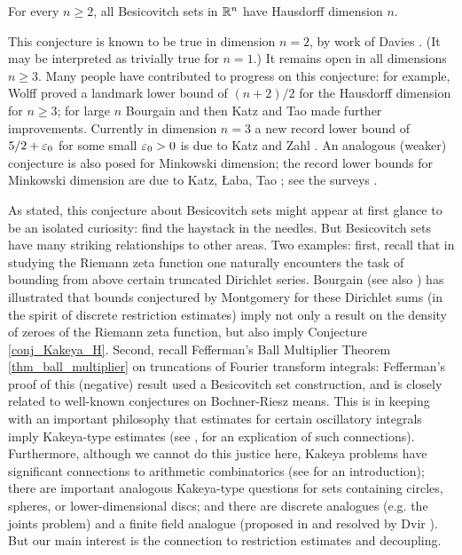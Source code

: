 \documentclass[brochure,english,12pt]{bourbaki}%
\begin{document}
\begin{conj}\label{conj_Kakeya_H}
For every $n \geq 2$, all Besicovitch sets in $\mathbb{R}^n$ have Hausdorff dimension $n$.
\end{conj}
This conjecture is known to be true in dimension $n=2$, by work of Davies \cite{Dav71}.  (It may be interpreted as trivially true for $n=1$.)
It remains open in all dimensions $n \geq 3$.
Many people have contributed to progress on this conjecture: for example, Wolff \cite{Wol95} proved a landmark lower bound of $(n+2)/2$ for the Hausdorff dimension for $n \geq 3$; for large $n$  Bourgain \cite{Bou99} and then Katz and Tao \cite{KatTao02b} made further improvements. Currently in dimension $n=3$ a new record lower bound of $5/2+\varepsilon_0$ for some small $\varepsilon_0>0$ is due to Katz and Zahl \cite{KatZah17x}.  An analogous (weaker) conjecture is also posed for Minkowski dimension; the record lower bounds for Minkowski dimension are due to Katz, \L aba, Tao \cite{KLT00,LabTao01,KatTao02b}; see the surveys \cite{KatTao02,Lab08}.


As stated, this conjecture about Besicovitch sets might appear at first glance to be an isolated curiosity: find the haystack in the needles. But Besicovitch sets have many striking relationships to other areas. Two examples: first, recall that in studying  the Riemann zeta function one naturally encounters the task of bounding from above certain truncated Dirichlet series. Bourgain \cite{Bou91a} (see also \cite{Wol99}) has illustrated that bounds conjectured by Montgomery  \cite[p. 72-73]{Mon71} for these Dirichlet sums  (in the spirit of discrete restriction estimates) imply not only a result on the density of zeroes of the Riemann zeta function, but also imply Conjecture \ref{conj_Kakeya_H}. 
Second, recall Fefferman's Ball Multiplier Theorem \ref{thm_ball_multiplier} on truncations of Fourier transform integrals: Fefferman's proof of this (negative) result used a Besicovitch set construction, and is closely related to well-known conjectures on Bochner-Riesz means.
This is in keeping  with an important philosophy that estimates for certain oscillatory integrals imply Kakeya-type estimates (see \cite{Fef73b},\cite{Car15x} for an explication of such connections). 
Furthermore, although we cannot do this justice here, Kakeya problems have  significant connections to arithmetic combinatorics (see \cite{Lab08} for an introduction);  there are  important analogous Kakeya-type questions for sets containing circles, spheres, or lower-dimensional discs; and there are discrete analogues (e.g. the joints problem) and a finite field analogue (proposed in \cite{MocTao04} and resolved by Dvir \cite{Dvi09}). But our main interest is  the connection to restriction estimates and decoupling.
\end{document}
